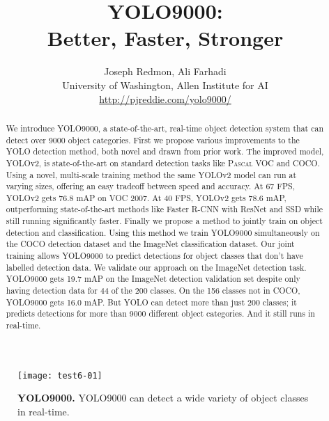 \documentclass[10pt,twocolumn,letterpaper]{article}
\newcommand{\rmed}{76.8}
\newcommand{\rxl}{78.6}
\newcommand{\smed}{67}
\newcommand{\sxl}{40}
\newcommand{\inet}{19.7}
\newcommand{\inone}{16.0}
\begin{document}
\title{\vspace{-2cm}YOLO9000: \\
Better, Faster, Stronger\vspace{-.25cm}}



\author{Joseph Redmon, Ali Farhadi\\
\small{University of Washington, Allen Institute for AI}\\ \url{http://pjreddie.com/yolo9000/}}

\maketitle
\begin{abstract}
\vspace{-.25cm}
We introduce YOLO9000, a state-of-the-art, real-time object detection system that can detect over 9000 object categories. First we propose various improvements to the YOLO detection method, both novel and drawn from prior work. The improved model, YOLOv2, is state-of-the-art on standard detection tasks like \textsc{Pascal} VOC and COCO. Using a novel, multi-scale training method the same YOLOv2 model can run at varying sizes, offering an easy tradeoff between speed and accuracy. At \smed{} FPS, YOLOv2 gets \rmed{} mAP on VOC 2007. At \sxl{} FPS, YOLOv2 gets \rxl{} mAP, outperforming state-of-the-art methods like Faster R-CNN with ResNet and SSD while still running significantly faster. Finally we propose a method to jointly train on object detection and classification. Using this method we train YOLO9000 simultaneously on the COCO detection dataset and the ImageNet classification dataset. Our joint training allows YOLO9000 to predict detections for object classes that don't have labelled detection data. We validate our approach on the ImageNet detection task. YOLO9000 gets \inet{} mAP on the ImageNet detection validation set despite only having detection data for 44 of the 200 classes. On the 156 classes not in COCO, YOLO9000 gets \inone{} mAP. But YOLO can detect more than just 200 classes; it predicts detections for more than 9000 different object categories. And it still runs in real-time.
\end{abstract}


\begin{figure}[]
      \centering
        \texttt{[image: test6-01]}
      \caption{\small \textbf{YOLO9000.} YOLO9000 can detect a wide variety of object classes in real-time.}
      \label{y9k}
   \end{figure}
\end{document}
